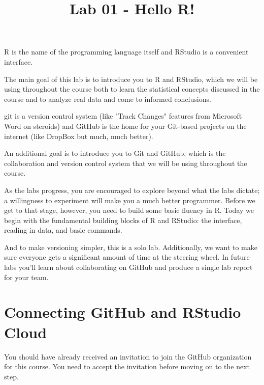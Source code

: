 \documentclass[
]{article}
\title{Lab 01 - Hello R!}
\author{}
\date{\vspace{-2.5em}}
\newenvironment{Shaded}{\begin{snugshade}}{\end{snugshade}}
\newcommand{\NormalTok}[1]{#1}
\begin{document}
\maketitle

{
\setcounter{tocdepth}{2}
\tableofcontents
}
\begin{Shaded}
\begin{Highlighting}[]
\NormalTok{R is the name of the programming language itself and RStudio is a convenient interface.}
\end{Highlighting}
\end{Shaded}

The main goal of this lab is to introduce you to R and RStudio, which we
will be using throughout the course both to learn the statistical
concepts discussed in the course and to analyze real data and come to
informed conclusions.

\begin{Shaded}
\begin{Highlighting}[]
\NormalTok{git is a version control system (like "Track Changes" features from Microsoft Word on steroids) and GitHub is the home for your Git{-}based projects on the internet (like DropBox but much, much better).}
\end{Highlighting}
\end{Shaded}

An additional goal is to introduce you to Git and GitHub, which is the
collaboration and version control system that we will be using
throughout the course.

As the labs progress, you are encouraged to explore beyond what the labs
dictate; a willingness to experiment will make you a much better
programmer. Before we get to that stage, however, you need to build some
basic fluency in R. Today we begin with the fundamental building blocks
of R and RStudio: the interface, reading in data, and basic commands.

And to make versioning simpler, this is a solo lab. Additionally, we
want to make sure everyone gets a significant amount of time at the
steering wheel. In future labs you'll learn about collaborating on
GitHub and produce a single lab report for your team.

\section{Connecting GitHub and RStudio
Cloud}\label{connecting-github-and-rstudio-cloud}

You should have already received an invitation to join the GitHub
organization for this course. You need to accept the invitation before
moving on to the next step.
\end{document}

